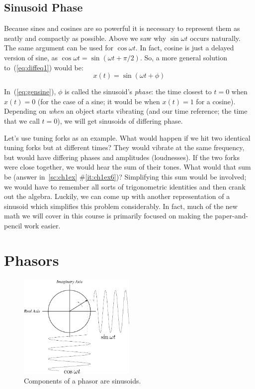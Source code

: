 \subsection*{Sinusoid Phase}

Because sines and cosines are so powerful it is necessary to represent them as neatly and compactly as possible. Above we saw why $\sin\omega t$ occurs naturally. The same argument can be used for $\cos\omega t$.  In fact, cosine is
just a delayed version of sine, as $\cos\omega t = \sin(\omega t +
\pi/2)$.  So, a more general solution to~(\ref{eq:diffeq1}) would
be:
\begin{equation}
x(t) = \sin(\omega t + \phi) \label{eq:gensine}
\end{equation}

In~(\ref{eq:gensine}), $\phi$ is called the sinusoid's \emph{phase}:
the time closest to $t=0$ when $x(t)=0$ (for the case of a sine; it
would be when $x(t)=1$ for a cosine). Depending on \emph{when} an object
starts vibrating (and our time reference; the time that we call $t=0$),
we will get sinusoids of differing phase.

Let's use tuning forks as an example. 
What would happen if we hit two identical tuning forks but at
different times?  They would vibrate at the same frequency, but would
have differing phases and amplitudes (loudnesses).  If the two forks
were close together, we would hear the sum of their tones. What would
that sum be (answer in~\ref{sc:ch1ex} \#\ref{it:ch1ex6})? Simplifying
this sum would be involved; we would have to remember all sorts of
trigonometric identities and then crank out the algebra. Luckily, we
can come up with another representation of a sinusoid which simplifies
this problem considerably. In fact, much of the new math we will cover
in this course is primarily focused on making the paper-and-pencil
work easier.

\section{Phasors}

\begin{figure}
\centerline{\includegraphics[width=0.5\textwidth]{ch-physical/phasor-components}}
\caption{Components of a phasor are sinusoids.\label{fg:phasor-components}}
\end{figure}

